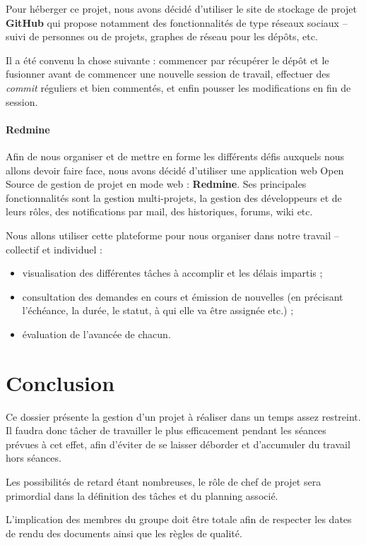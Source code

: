 Pour héberger ce projet, nous avons décidé d'utiliser le site de stockage de projet \textbf{GitHub} qui propose notamment des fonctionnalités de type réseaux sociaux -- suivi de personnes ou de projets, graphes de réseau pour les dépôts, etc.

Il a été convenu la chose suivante : commencer par récupérer le dépôt et le fusionner avant de commencer une nouvelle session de travail, effectuer des \textit{commit} réguliers et bien commentés, et enfin pousser les modifications en fin de session.

\paragraph*{Redmine\\}

Afin de nous organiser et de mettre en forme les différents défis auxquels nous allons devoir faire face, nous avons décidé d'utiliser une application web Open Source de gestion de projet en mode web : \textbf{Redmine}. Ses principales fonctionnalités sont la gestion multi-projets, la gestion des développeurs et de leurs rôles, des notifications par mail, des historiques, forums, wiki etc.

Nous allons utiliser cette plateforme pour nous organiser dans notre travail -- collectif et individuel :

\begin{itemize}
  \item visualisation des différentes tâches à accomplir et les délais impartis ;
  \item consultation des demandes en cours et émission de nouvelles (en précisant l'échéance, la durée, le statut, à qui elle va être assignée etc.) ;
  \item évaluation de l'avancée de chacun.
\end{itemize}


\section{Conclusion}
Ce dossier présente la gestion d'un projet à réaliser dans un temps assez restreint. Il faudra donc tâcher de travailler le plus efficacement pendant les séances prévues à cet effet, afin d'éviter de se laisser déborder et d'accumuler du travail hors séances.

Les possibilités de retard étant nombreuses, le rôle de chef de projet sera primordial dans la définition des tâches et du planning associé.

L'implication des membres du groupe doit être totale afin de respecter les dates de rendu des documents ainsi que les règles de qualité.

